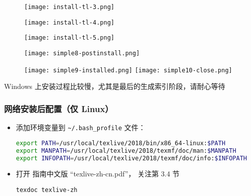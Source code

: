 \begin{frame}
  \begin{figure}[h]
    \centering
    \texttt{[image: install-tl-3.png]}
  \end{figure}
\end{frame}


\begin{frame}
  \begin{figure}[h]
    \centering
    \texttt{[image: install-tl-4.png]}
  \end{figure}
\end{frame}

\begin{frame}
  \begin{figure}[h]
    \centering
    \texttt{[image: install-tl-5.png]}
  \end{figure}
\end{frame}

\begin{frame}
  \begin{figure}[h]
    \centering
    \texttt{[image: simple8-postinstall.png]}
  \end{figure}
\end{frame}

\begin{frame}
  \begin{figure}[h]
    \centering
    \texttt{[image: simple9-installed.png]}%
    \hspace{2em}
    \texttt{[image: simple10-close.png]}
  \end{figure}

  \centering Windows 上安装过程比较慢，尤其是最后的生成索引阶段，请耐心等待

\end{frame}

\begin{frame}[fragile]
  \frametitle{网络安装后配置（仅 Linux）}
  \begin{itemize}
    \item
      添加环境变量到 \nolinkurl{~/.bash_profile} 文件：
      \begin{lstlisting}[language=bash]
export PATH=/usr/local/texlive/2018/bin/x86_64-linux:$PATH
export MANPATH=/usr/local/texlive/2018/texmf/doc/man:$MANPATH
export INFOPATH=/usr/local/texlive/2018/texmf/doc/info:$INFOPATH
      \end{lstlisting}
  \item
    打开 \TeXLive 指南中文版 ``texlive-zh-cn.pdf''，
    关注第 3.4 节
      \begin{lstlisting}[basicstyle=\ttfamily]
texdoc texlive-zh
      \end{lstlisting}
  \end{itemize}
\end{frame}

